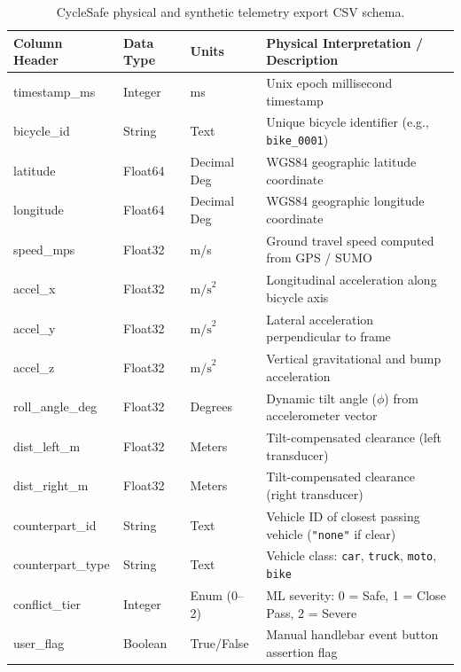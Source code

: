 \begin{table}[h!]
	\centering
	\caption{CycleSafe physical and synthetic telemetry export CSV schema.}
	\label{tab:csv_schema}
	\setlength{\tabcolsep}{5pt}
	\renewcommand{\arraystretch}{1.2}
	\begin{tabularx}{\textwidth}{|>{\ttfamily\raggedright\arraybackslash}p{3.5cm}|p{1.8cm}|p{1.8cm}|X|}
		\hline
		\textbf{\textnormal{\textbf{Column Header}}} & \textbf{Data Type} & \textbf{Units} & \textbf{Physical Interpretation / Description} \\
		\hline
		\hline
		timestamp\_ms & Integer & ms & Unix epoch millisecond timestamp \\
		bicycle\_id & String & Text & Unique bicycle identifier (e.g., \texttt{bike\_0001}) \\
		latitude & Float64 & Decimal Deg & WGS84 geographic latitude coordinate \\
		longitude & Float64 & Decimal Deg & WGS84 geographic longitude coordinate \\
		speed\_mps & Float32 & m/s & Ground travel speed computed from GPS / SUMO \\
		accel\_x & Float32 & $\text{m/s}^2$ & Longitudinal acceleration along bicycle axis \\
		accel\_y & Float32 & $\text{m/s}^2$ & Lateral acceleration perpendicular to frame \\
		accel\_z & Float32 & $\text{m/s}^2$ & Vertical gravitational and bump acceleration \\
		roll\_angle\_deg & Float32 & Degrees & Dynamic tilt angle ($\phi$) from accelerometer vector \\
		dist\_left\_m & Float32 & Meters & Tilt-compensated clearance (left transducer) \\
		dist\_right\_m & Float32 & Meters & Tilt-compensated clearance (right transducer) \\
		counterpart\_id & String & Text & Vehicle ID of closest passing vehicle (\texttt{"none"} if clear) \\
		counterpart\_type & String & Text & Vehicle class: \texttt{car}, \texttt{truck}, \texttt{moto}, \texttt{bike} \\
		conflict\_tier & Integer & Enum (0--2) & ML severity: 0 = Safe, 1 = Close Pass, 2 = Severe \\
		user\_flag & Boolean & True/False & Manual handlebar event button assertion flag \\
		\hline
	\end{tabularx}
\end{table}

